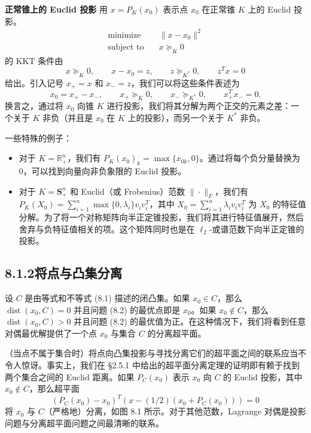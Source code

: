 \documentclass[UTF8,12pt,a4paper,fontset=fandol]{ctexart}
\begin{document}
\noindent\textbf{正常锥上的 Euclid 投影}\quad
用 $x=P_K(x_0)$ 表示点 $x_0$ 在正常锥 $K$ 上的 Euclid 投影。
\[
\begin{aligned}
\text{minimize}\quad & \|x-x_0\|^2\\
\text{subject to}\quad & x\succeq_K 0
\end{aligned}
\]
的 KKT 条件由
\[
x\succeq_K 0,\qquad x-x_0=z,\qquad z\succeq_{K^\ast}0,\qquad z^Tx=0
\]
给出。引入记号 $x_+=x$ 和 $x_-=z$，我们可以将这些条件表述为
\[
x_0=x_+-x_-,\qquad x_+\succeq_K0,\qquad x_-\succeq_{K^\ast}0,\qquad x_+^Tx_-=0.
\]
换言之，通过将 $x_0$ 向锥 $K$ 进行投影，我们将其分解为两个正交的元素之差：一个关于 $K$ 非负（并且是 $x_0$ 在 $K$ 上的投影），而另一个关于 $K^\ast$ 非负。

一些特殊的例子：

\begin{itemize}
\item 对于 $K=\mathbb{R}_+^n$，我们有 $P_K(x_0)_k=\max\{x_{0k},0\}$。通过将每个负分量替换为 $0$，可以找到向量向非负象限的 Euclid 投影。

\item 对于 $K=\mathbf{S}_+^n$ 和 Euclid（或 Frobenius）范数 $\|\cdot\|_F$，我们有 $P_K(X_0)=\sum_{i=1}^n \max\{0,\lambda_i\}v_iv_i^T$，其中 $X_0=\sum_{i=1}^n \lambda_i v_iv_i^T$ 为 $X_0$ 的特征值分解。为了将一个对称矩阵向半正定锥投影，我们将其进行特征值展开，然后舍弃与负特征值相关的项。这个矩阵同时也是在 $\ell_2$-或谱范数下向半正定锥的投影。
\end{itemize}

\subsection*{8.1.2\quad 将点与凸集分离}

设 $C$ 是由等式和不等式 (8.1) 描述的闭凸集。如果 $x_0\in C$，那么 $\operatorname{dist}(x_0,C)=0$ 并且问题 (8.2) 的最优点即是 $x_0$。如果 $x_0\notin C$，那么 $\operatorname{dist}(x_0,C)>0$ 并且问题 (8.2) 的最优值为正。在这种情况下，我们将看到任意对偶最优解提供了一个点 $x_0$ 与集合 $C$ 的分离超平面。

（当点不属于集合时）将点向凸集投影与寻找分离它们的超平面之间的联系应当不令人惊讶。事实上，我们在 \S 2.5.1 中给出的超平面分离定理的证明即有赖于找到两个集合之间的 Euclid 距离。如果 $P_C(x_0)$ 表示 $x_0$ 向 $C$ 的 Euclid 投影，其中 $x_0\notin C$，那么超平面
\[
(P_C(x_0)-x_0)^T\left(x-(1/2)(x_0+P_C(x_0))\right)=0
\]
将 $x_0$ 与 $C$（严格地）分离，如图 8.1 所示。对于其他范数，Lagrange 对偶是投影问题与分离超平面问题之间最清晰的联系。
\end{document}
